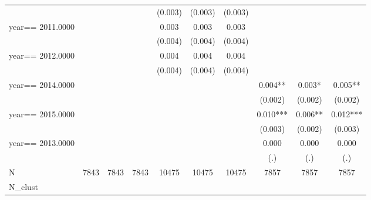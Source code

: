\begin{table}[htbp]
\begin{tabular}{l*{9}{c}}
                    &               &               &               &     (0.003)   &     (0.003)   &     (0.003)   &               &               &               \\
year==  2011.0000   &               &               &               &       0.003   &       0.003   &       0.003   &               &               &               \\
                    &               &               &               &     (0.004)   &     (0.004)   &     (0.004)   &               &               &               \\
year==  2012.0000   &               &               &               &       0.004   &       0.004   &       0.004   &               &               &               \\
                    &               &               &               &     (0.004)   &     (0.004)   &     (0.004)   &               &               &               \\
year==  2014.0000   &               &               &               &               &               &               &       0.004** &       0.003*  &       0.005** \\
                    &               &               &               &               &               &               &     (0.002)   &     (0.002)   &     (0.002)   \\
year==  2015.0000   &               &               &               &               &               &               &       0.010***&       0.006** &       0.012***\\
                    &               &               &               &               &               &               &     (0.003)   &     (0.002)   &     (0.003)   \\
year==  2013.0000   &               &               &               &               &               &               &       0.000   &       0.000   &       0.000   \\
                    &               &               &               &               &               &               &         (.)   &         (.)   &         (.)   \\
\hline
N                   &        7843   &        7843   &        7843   &       10475   &       10475   &       10475   &        7857   &        7857   &        7857   \\
N\_clust             &               &               &               &               &               &               &               &               &               \\

\end{tabular}
\end{table}
